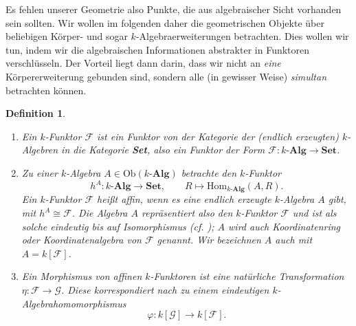 \documentclass[a4paper, 11pt]{scrartcl}
\newcommand{\Hom}{\text{Hom}}
\newcommand{\Ob}{\text{Ob}}
\newcommand{\F}{\mathcal{F}}
\theoremstyle{basicstyle}
\newtheorem{definition}{Definition}[section]
\begin{document}
    Es fehlen unserer Geometrie also Punkte, die aus algebraischer Sicht vorhanden sein sollten.
    Wir wollen im folgenden daher die geometrischen Objekte über beliebigen Körper- und sogar \(k\)-Algebraerweiterungen betrachten.
    Dies wollen wir tun, indem wir die algebraischen Informationen abstrakter in Funktoren verschlüsseln.
    Der Vorteil liegt dann darin, dass wir nicht an \emph{eine} Körpererweiterung gebunden sind, sondern alle (in gewisser Weise) \emph{simultan} betrachten können.

    \begin{definition}
        \begin{enumerate}
            \item Ein \emph{\(k\)-Funktor} \(\mathcal{F}\) ist ein Funktor von der Kategorie der (endlich erzeugten) \(k\)-Algebren in die Kategorie \textbf{Set}, also ein Funktor der Form \(\mathcal{F}: k\textbf{-Alg} \to \textbf{Set}\).
            
            \item Zu einer \(k\)-Algebra \(A \in \Ob(k\textbf{-Alg})\) betrachte den \(k\)-Funktor
                \[h^A : k\textbf{-Alg} \longrightarrow \textbf{Set}, \qquad R \mapsto \Hom_{k\textbf{-Alg}}(A, R).\]
                Ein \(k\)-Funktor \(\mathcal{F}\) heißt \emph{affin}, wenn es eine endlich erzeugte \(k\)-Algebra \(A\) gibt, mit \(h^A \cong \mathcal{F}\).
                Die Algebra \(A\) \emph{repräsentiert} also den \(k\)-Funktor \(\mathcal{F}\) und ist als solche eindeutig bis auf Isomorphismus (cf. ); \(A\) wird auch \emph{Koordinatenring} oder \emph{Koordinatenalgebra} von \(\mathcal{F}\) genannt.
                Wir bezeichnen \(A\) auch mit \(A = k[\mathcal{F}]\).

            \item Ein Morphismus von affinen \(k\)-Funktoren ist eine natürliche Transformation \(\eta: \F \to \mathcal{G}\).
                Diese korrespondiert nach  zu einem eindeutigen \(k\)-Algebrahomomorphismus \[\varphi: k[\mathcal{G}] \to k[\F].\]
        \end{enumerate}
    \end{definition}
\end{document}
